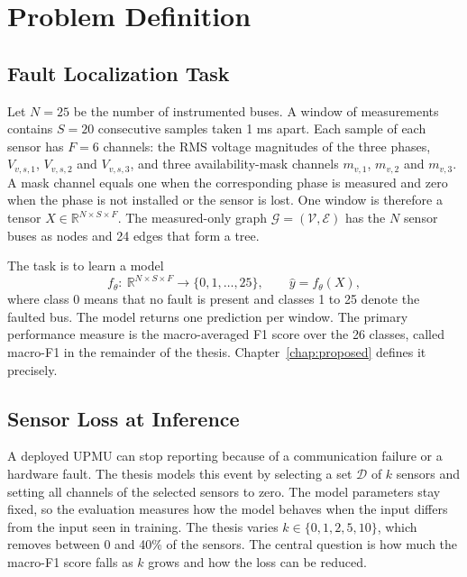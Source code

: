 \documentclass[MTech]{ugthesis}
\begin{document}
\section{Problem Definition}

\subsection{Fault Localization Task}

Let $N=25$ be the number of instrumented buses. A window of measurements contains $S=20$ consecutive samples taken 1 ms apart. Each sample of each sensor has $F=6$ channels: the \ac{RMS} voltage magnitudes of the three phases, $V_{v,s,1}$, $V_{v,s,2}$ and $V_{v,s,3}$, and three availability-mask channels $m_{v,1}$, $m_{v,2}$ and $m_{v,3}$. A mask channel equals one when the corresponding phase is measured and zero when the phase is not installed or the sensor is lost. One window is therefore a tensor $X\in\mathbb{R}^{N\times S\times F}$. The measured-only graph $\mathcal{G}=(\mathcal{V},\mathcal{E})$ has the $N$ sensor buses as nodes and 24 edges that form a tree.

The task is to learn a model
\begin{equation}
f_{\theta}:\ \mathbb{R}^{N\times S\times F}\rightarrow\{0,1,\dots,25\},\qquad \hat{y}=f_{\theta}(X),
\label{eq:task}
\end{equation}
where class 0 means that no fault is present and classes 1 to 25 denote the faulted bus. The model returns one prediction per window. The primary performance measure is the macro-averaged F1 score over the 26 classes, called macro-F1 in the remainder of the thesis. Chapter~\ref{chap:proposed} defines it precisely.

\subsection{Sensor Loss at Inference}

A deployed \ac{UPMU} can stop reporting because of a communication failure or a hardware fault. The thesis models this event by selecting a set $\mathcal{D}$ of $k$ sensors and setting all channels of the selected sensors to zero. The model parameters stay fixed, so the evaluation measures how the model behaves when the input differs from the input seen in training. The thesis varies $k\in\{0,1,2,5,10\}$, which removes between 0 and 40\% of the sensors. The central question is how much the macro-F1 score falls as $k$ grows and how the loss can be reduced.
\end{document}
